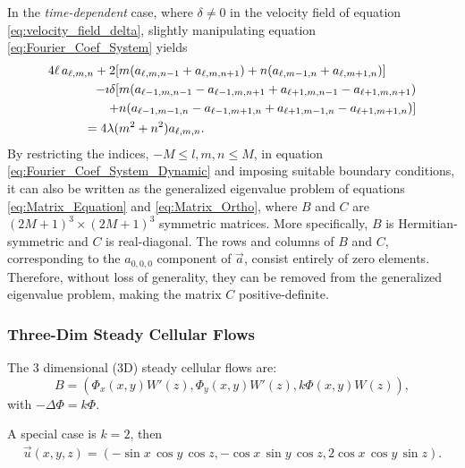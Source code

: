 \documentclass[11pt]{amsart}
\begin{document}
In the \emph{time-dependent} case, where $\delta\neq0$ in the velocity field
of equation \eqref{eq:velocity_field_delta}, slightly manipulating equation
\eqref{eq:Fourier_Coef_System} yields 
%
\begin{align}\label{eq:Fourier_Coef_System_Dynamic}
4\ell\,a_{\ell,m,n}
+2[&m(a_{\ell,m,n-1}+a_{\ell,m,n+1})+n(a_{\ell,m-1,n}+a_{\ell,m+1,n})]
\notag\\
-\imath\delta[&m(a_{\ell-1,m,n-1}-a_{\ell-1,m,n+1}+a_{\ell+1,m,n-1}-a_{\ell+1,m,n+1})\notag\\
    +&n(a_{\ell-1,m-1,n}-a_{\ell-1,m+1,n}+a_{\ell+1,m-1,n}-a_{\ell+1,m+1,n})] 
\notag\\
=4\lambda(&m^2+n^2)a_{\ell,m,n}.
\end{align}
%
By restricting the indices, $-M\leq l,m,n\leq M$, in equation
\eqref{eq:Fourier_Coef_System_Dynamic} and imposing suitable boundary 
conditions, it can also be
written as the generalized eigenvalue problem of equations
\eqref{eq:Matrix_Equation} and \eqref{eq:Matrix_Ortho}, where  $B$ and
$C$ are $(2M+1)^3\times(2M+1)^3$ symmetric matrices. More specifically,
$B$ is Hermitian-symmetric and $C$ is real-diagonal. The rows and
columns of $B$ and $C$, corresponding to the $a_{0,0,0}$ component of
$\vec{a}$, consist entirely of zero elements. Therefore, without loss
of generality, they can be removed from the generalized eigenvalue
problem, making the matrix $C$ positive-definite.  






\subsubsection{Three-Dim Steady Cellular Flows}
The 3 dimensional (3D) steady cellular flows are:
%
\begin{equation}
B =
(\Phi_x(x,y)W'(z),\Phi_y(x,y)W'(z),k\Phi(x,y)W(z)), \label{3dcell}
\end{equation}
with $-\Delta \Phi = k \Phi.$   
\medskip

A special case is $k=2$, then
%
\begin{align}\label{3dcell-1}
  \vec{u}(x,y,z) =
  (-\sin{x}\,\cos{y}\,\cos{z},-\cos{x}\,\sin{y}\,\cos{z},2\cos{x}\,\cos{y}\,\sin{z}).  
\end{align}

\medskip

\end{document}
